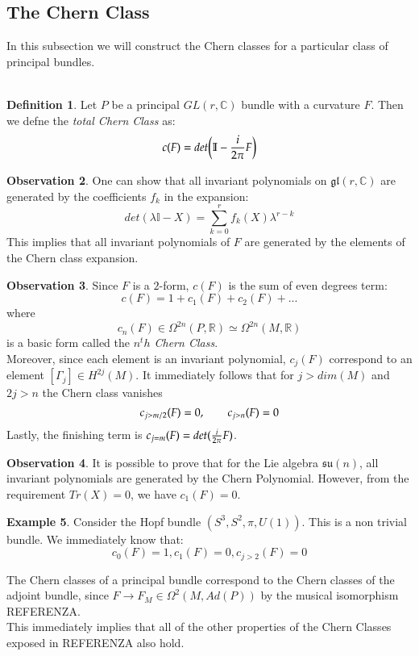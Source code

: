 \documentclass[12pt,a4paper]{report}
\theoremstyle{definition}
\newtheorem{Def}{Definition}[chapter]
\theoremstyle{Theorem}
\theoremstyle{break}
\newtheorem{Ex}[Def]{Example}
\theoremstyle{definition}
\newtheorem{Obs}[Def]{Observation}
\begin{document}
		\subsection{The Chern Class}
			In this subsection we will construct the Chern classes for a particular class of principal bundles.\\
			\\
			\begin{Def}
				Let $P$ be a principal $GL(r,\mathbb{C})$ bundle with a curvature $F$. Then we defne the \textit{total Chern Class} as:
				$$c(F)=det\bigg(\mathbb{I}-{i\over 2\pi}F\bigg)$$ 
			\end{Def}
			\begin{Obs}
				One can show that all invariant polynomials on $\mathfrak{gl}(r,\mathbb{C})$ are generated by the coefficients $f_k$ in the expansion:
				$$det(\lambda\mathbb{I}-X)=\sum_{k=0}^r f_k(X)\lambda^{r-k}$$
				This implies that all invariant polynomials of $F$ are generated by the elements of the Chern class expansion.
			\end{Obs}
			\begin{Obs}
				Since $F$ is a $2$-form, $c(F)$ is the sum of even degrees term:
				$$c(F)=1+c_1(F)+c_2(F)+...$$
				where $$c_n(F)\in\Omega^{2n}(P,\mathbb{R})\simeq\Omega^{2n}(M,\mathbb{R})$$
				is a basic form called the \textit{$n^th$ Chern Class}.\\
				Moreover, since each element is an invariant polynomial, $c_j(F)$ correspond to an element $[\Gamma_j]\in H^{2j}(M)$. It immediately follows that for $j>dim(M)$ and $2j>n$ the Chern class vanishes 
				$$c_{j>m/2}(F)=0,\hspace{20 pt}c_{j>n}(F)=0$$
				Lastly, the finishing term is $c_{j=m}(F)=det({i\over 2\pi}F)$.
			\end{Obs}
			\begin{Obs}
				It is possible to prove that for the Lie algebra $\mathfrak{su}(n)$, all invariant polynomials are generated by the Chern Polynomial. However, from the requirement $Tr(X)=0$, we have $c_1(F)=0$.
			\end{Obs}
			\begin{Ex}
				Consider the Hopf bundle $(S^3,S^2,\pi,U(1))$. This is a non trivial bundle. We immediately know that:
				$$c_0(F)=1,c_1(F)=0,c_{j>2}(F)=0$$
			\end{Ex}
			The Chern classes of a principal bundle correspond to the Chern classes of the adjoint bundle, since $F\rightarrow F_M\in\Omega^2(M,Ad(P))$ by the musical isomorphism REFERENZA.\\
			This immediately implies that all of the other properties of the Chern Classes exposed in REFERENZA also hold.
\end{document}
